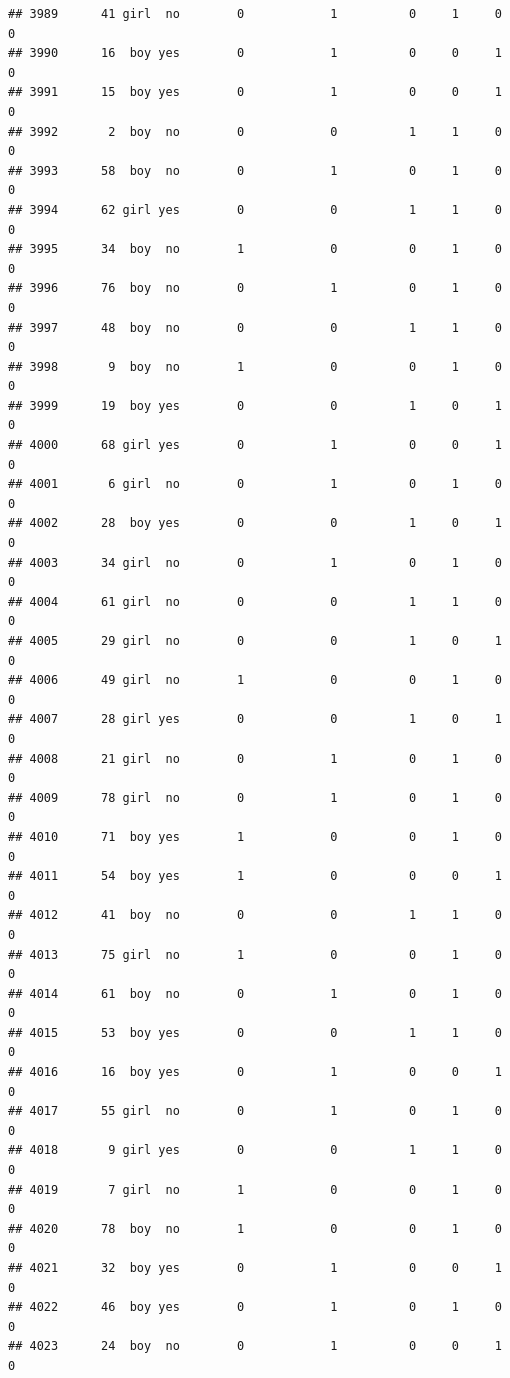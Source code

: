 \documentclass[man]{apa6}
\begin{document}
\begin{verbatim}
## 3989      41 girl  no        0            1          0     1     0     0
## 3990      16  boy yes        0            1          0     0     1     0
## 3991      15  boy yes        0            1          0     0     1     0
## 3992       2  boy  no        0            0          1     1     0     0
## 3993      58  boy  no        0            1          0     1     0     0
## 3994      62 girl yes        0            0          1     1     0     0
## 3995      34  boy  no        1            0          0     1     0     0
## 3996      76  boy  no        0            1          0     1     0     0
## 3997      48  boy  no        0            0          1     1     0     0
## 3998       9  boy  no        1            0          0     1     0     0
## 3999      19  boy yes        0            0          1     0     1     0
## 4000      68 girl yes        0            1          0     0     1     0
## 4001       6 girl  no        0            1          0     1     0     0
## 4002      28  boy yes        0            0          1     0     1     0
## 4003      34 girl  no        0            1          0     1     0     0
## 4004      61 girl  no        0            0          1     1     0     0
## 4005      29 girl  no        0            0          1     0     1     0
## 4006      49 girl  no        1            0          0     1     0     0
## 4007      28 girl yes        0            0          1     0     1     0
## 4008      21 girl  no        0            1          0     1     0     0
## 4009      78 girl  no        0            1          0     1     0     0
## 4010      71  boy yes        1            0          0     1     0     0
## 4011      54  boy yes        1            0          0     0     1     0
## 4012      41  boy  no        0            0          1     1     0     0
## 4013      75 girl  no        1            0          0     1     0     0
## 4014      61  boy  no        0            1          0     1     0     0
## 4015      53  boy yes        0            0          1     1     0     0
## 4016      16  boy yes        0            1          0     0     1     0
## 4017      55 girl  no        0            1          0     1     0     0
## 4018       9 girl yes        0            0          1     1     0     0
## 4019       7 girl  no        1            0          0     1     0     0
## 4020      78  boy  no        1            0          0     1     0     0
## 4021      32  boy yes        0            1          0     0     1     0
## 4022      46  boy yes        0            1          0     1     0     0
## 4023      24  boy  no        0            1          0     0     1     0

\end{verbatim}
\end{document}
